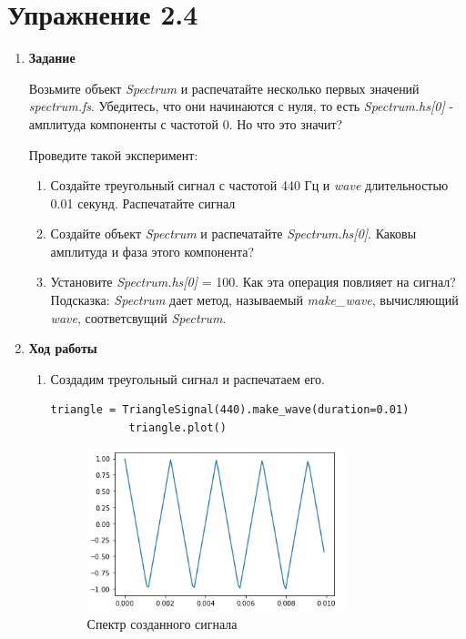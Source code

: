 \documentclass[a4paper,12pt]{article}
\begin{document}
\newpage

\section{Упражнение 2.4}

\begin{enumerate}
	
	\item \textbf{Задание}
	
	Возьмите объект \textit{Spectrum} и распечатайте несколько первых значений \textit{spectrum.fs}. Убедитесь, что они начинаются с нуля, то есть \textit{Spectrum.hs[0]} - амплитуда компоненты с частотой 0. Но что это значит?
	
	Проведите такой эксперимент:
	\begin{enumerate}
		\item Создайте треугольный сигнал с частотой 440 Гц и \textit{wave} длительностью 0.01 секунд. Распечатайте сигнал
		
		\item Создайте объект \textit{Spectrum} и распечатайте \textit{Spectrum.hs[0]}. Каковы амплитуда и фаза этого компонента?
		
		\item Установите \textit{Spectrum.hs[0]} = 100. Как эта операция повлияет на сигнал? Подсказка: \textit{Spectrum} дает метод, называемый \textit{make\_wave}, вычисляющий \textit{wave}, соответсвущий \textit{Spectrum}.
	\end{enumerate}
	
	\item \textbf{Ход работы}
	
	\begin{enumerate}
		\item Создадим треугольный сигнал и распечатаем его.
		
		\begin{lstlisting}[caption=Создание треугольного сигнала]
			triangle = TriangleSignal(440).make_wave(duration=0.01)
			triangle.plot()
		\end{lstlisting}
		\begin{figure}[H]
			\centering
			\includegraphics[width=0.75\textwidth]{4_1.png}
			\caption{Спектр созданного сигнала}
			\label{fig:4.1}
		\end{figure}
	

\end{enumerate}
\end{enumerate}
\end{document}
